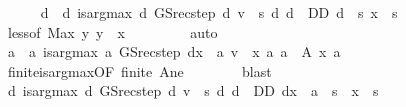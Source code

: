 \begin{isabellebody}
\ \ \ \ \isamarkupfalse%
\ d\ \ d{\isacharcolon}{\kern0pt}\ {\isachardoublequoteopen}is{\isacharunderscore}{\kern0pt}arg{\isacharunderscore}{\kern0pt}max\ {\isacharparenleft}{\kern0pt}{\isasymlambda}d{\isachardot}{\kern0pt}\ GS{\isacharunderscore}{\kern0pt}rec{\isacharunderscore}{\kern0pt}step\ d\ v\ {\isachardollar}{\kern0pt}\ s{\isacharprime}{\kern0pt}{\isacharparenright}{\kern0pt}\ {\isacharparenleft}{\kern0pt}{\isasymlambda}d{\isachardot}{\kern0pt}\ d\ {\isasymin}\ D\isactrlsub D{\isacharparenright}{\kern0pt}\ d{\isachardoublequoteclose}\ \ {\isachardoublequoteopen}s{\isacharprime}{\kern0pt}{\isacharless}{\kern0pt}\ x{\isachardoublequoteclose}\ \ s{\isacharprime}{\kern0pt}\isanewline
\ \ \ \ \ \ \isamarkupfalse%
\ less{\isacharbrackleft}{\kern0pt}of\ {\isachardoublequoteopen}Max\ {\isacharbraceleft}{\kern0pt}y{\isachardot}{\kern0pt}\ y\ {\isacharless}{\kern0pt}\ x{\isacharbraceright}{\kern0pt}{\isachardoublequoteclose}{\isacharbrackright}{\kern0pt}\ {}\isanewline
\ \ \ \ \ \ \isamarkupfalse%
\ auto\isanewline
\ \ \ \ \isamarkupfalse%
\ a\ \ a{\isacharcolon}{\kern0pt}\ {\isachardoublequoteopen}is{\isacharunderscore}{\kern0pt}arg{\isacharunderscore}{\kern0pt}max\ {\isacharparenleft}{\kern0pt}{\isasymlambda}a{\isachardot}{\kern0pt}\ GS{\isacharunderscore}{\kern0pt}rec{\isacharunderscore}{\kern0pt}step\ {\isacharparenleft}{\kern0pt}d{\isacharparenleft}{\kern0pt}x\ {\isacharcolon}{\kern0pt}{\isacharequal}{\kern0pt}\ a{\isacharparenright}{\kern0pt}{\isacharparenright}{\kern0pt}\ v\ {\isachardollar}{\kern0pt}\ x{\isacharparenright}{\kern0pt}\ {\isacharparenleft}{\kern0pt}{\isasymlambda}a{\isachardot}{\kern0pt}\ a\ {\isasymin}\ A\ x{\isacharparenright}{\kern0pt}\ a{\isachardoublequoteclose}\isanewline
\ \ \ \ \ \ \isamarkupfalse%
\ finite{\isacharunderscore}{\kern0pt}is{\isacharunderscore}{\kern0pt}arg{\isacharunderscore}{\kern0pt}max{\isacharbrackleft}{\kern0pt}OF\ finite\ A{\isacharunderscore}{\kern0pt}ne{\isacharbrackright}{\kern0pt}\isanewline
\ \ \ \ \ \ \isamarkupfalse%
\ blast\isanewline
\ \ \ \ \isamarkupfalse%
\ d{\isacharprime}{\kern0pt}{\isacharcolon}{\kern0pt}\ {\isachardoublequoteopen}is{\isacharunderscore}{\kern0pt}arg{\isacharunderscore}{\kern0pt}max\ {\isacharparenleft}{\kern0pt}{\isasymlambda}d{\isachardot}{\kern0pt}\ GS{\isacharunderscore}{\kern0pt}rec{\isacharunderscore}{\kern0pt}step\ d\ v\ {\isachardollar}{\kern0pt}\ s{\isacharprime}{\kern0pt}{\isacharparenright}{\kern0pt}\ {\isacharparenleft}{\kern0pt}{\isasymlambda}d{\isachardot}{\kern0pt}\ d\ {\isasymin}\ D\isactrlsub D{\isacharparenright}{\kern0pt}\ {\isacharparenleft}{\kern0pt}d{\isacharparenleft}{\kern0pt}x\ {\isacharcolon}{\kern0pt}{\isacharequal}{\kern0pt}\ a{\isacharparenright}{\kern0pt}{\isacharparenright}{\kern0pt}{\isachardoublequoteclose}\ \ {\isachardoublequoteopen}s{\isacharprime}{\kern0pt}\ {\isacharless}{\kern0pt}\ x{\isachardoublequoteclose}\ \ s{\isacharprime}{\kern0pt}\isanewline

\end{isabellebody}
